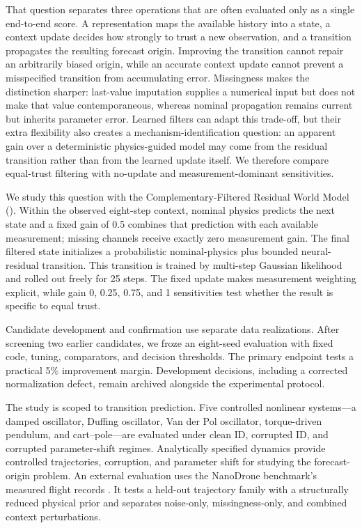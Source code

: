 That question separates three operations that are often evaluated only as a
single end-to-end score. A representation maps the available history into a
state, a context update decides how strongly to trust a new observation, and a
transition propagates the resulting forecast origin. Improving the transition
cannot repair an arbitrarily biased origin, while an accurate context update
cannot prevent a misspecified transition from accumulating error. Missingness
makes the distinction sharper: last-value imputation supplies a numerical
input but does not make that value contemporaneous, whereas nominal propagation
remains current but inherits parameter error. Learned filters can adapt this
trade-off, but their extra flexibility also creates a mechanism-identification
question: an apparent gain over a deterministic physics-guided model may come
from the residual transition rather than from the learned update itself. We
therefore compare equal-trust filtering with no-update and
measurement-dominant sensitivities.

We study this question with the Complementary-Filtered Residual World Model
(\method). Within the observed eight-step context, nominal physics predicts the
next state and a fixed gain of 0.5 combines that prediction with each available
measurement; missing channels receive exactly zero measurement gain. The final
filtered state initializes a probabilistic nominal-physics plus bounded neural-
residual transition. This transition is trained by multi-step Gaussian
likelihood and rolled out freely for 25 steps. The fixed update makes
measurement weighting explicit, while gain 0, 0.25, 0.75, and 1 sensitivities
test whether the result is specific to equal trust.

Candidate development and confirmation use separate data realizations. After
screening two earlier candidates, we froze an eight-seed evaluation with fixed
code, tuning, comparators, and decision thresholds. The primary endpoint tests
a practical 5\% improvement margin. Development decisions, including a
corrected normalization defect, remain archived alongside the experimental
protocol.

The study is scoped to transition prediction. Five controlled nonlinear
systems---a damped oscillator, Duffing oscillator, Van der Pol oscillator,
torque-driven pendulum, and cart--pole---are evaluated under clean ID,
corrupted ID, and corrupted parameter-shift regimes. Analytically specified
dynamics provide controlled trajectories, corruption, and parameter shift for
studying the forecast-origin problem.
An external evaluation uses the NanoDrone benchmark's measured flight records
\cite{busetto2026_nanodrone}. It tests a held-out trajectory family with a
structurally reduced physical prior and separates noise-only, missingness-only,
and combined context perturbations.

